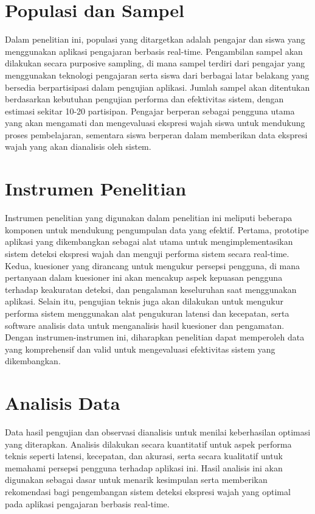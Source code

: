 \section{Populasi dan Sampel}
Dalam penelitian ini, populasi yang ditargetkan adalah pengajar dan siswa yang menggunakan aplikasi pengajaran berbasis real-time. Pengambilan sampel akan dilakukan secara purposive sampling, di mana sampel terdiri dari pengajar yang menggunakan teknologi pengajaran serta siswa dari berbagai latar belakang yang bersedia berpartisipasi dalam pengujian aplikasi. Jumlah sampel akan ditentukan berdasarkan kebutuhan pengujian performa dan efektivitas sistem, dengan estimasi sekitar 10-20 partisipan. Pengajar berperan sebagai pengguna utama yang akan mengamati dan mengevaluasi ekspresi wajah siswa untuk mendukung proses pembelajaran, sementara siswa berperan dalam memberikan data ekspresi wajah yang akan dianalisis oleh sistem.

\section{Instrumen Penelitian}
Instrumen penelitian yang digunakan dalam penelitian ini meliputi beberapa komponen untuk mendukung pengumpulan data yang efektif. Pertama, prototipe aplikasi yang dikembangkan sebagai alat utama untuk mengimplementasikan sistem deteksi ekspresi wajah dan menguji performa sistem secara real-time. Kedua, kuesioner yang dirancang untuk mengukur persepsi pengguna, di mana pertanyaan dalam kuesioner ini akan mencakup aspek kepuasan pengguna terhadap keakuratan deteksi, dan pengalaman keseluruhan saat menggunakan aplikasi. Selain itu, pengujian teknis juga akan dilakukan untuk mengukur performa sistem menggunakan alat pengukuran latensi dan kecepatan, serta software analisis data untuk menganalisis hasil kuesioner dan pengamatan. Dengan instrumen-instrumen ini, diharapkan penelitian dapat memperoleh data yang komprehensif dan valid untuk mengevaluasi efektivitas sistem yang dikembangkan.

\section{Analisis Data}
Data hasil pengujian dan observasi dianalisis untuk menilai keberhasilan optimasi yang diterapkan. Analisis dilakukan secara kuantitatif untuk aspek performa teknis seperti latensi, kecepatan, dan akurasi, serta secara kualitatif untuk memahami persepsi pengguna terhadap aplikasi ini. Hasil analisis ini akan digunakan sebagai dasar untuk menarik kesimpulan serta memberikan rekomendasi bagi pengembangan sistem deteksi ekspresi wajah yang optimal pada aplikasi pengajaran berbasis real-time.
